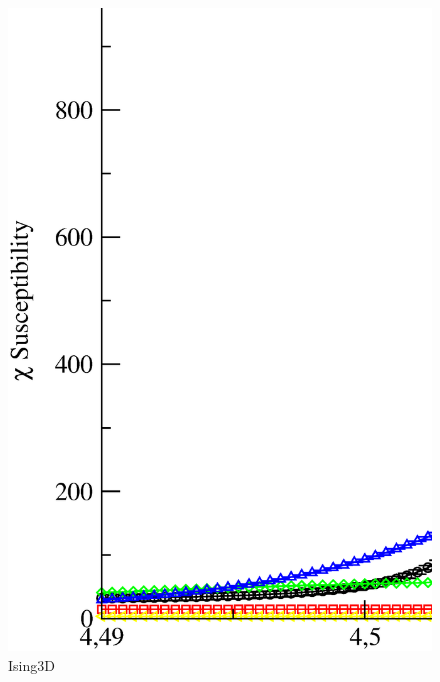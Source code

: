 \begin{figure}[!htpb]
  \centering
  \includegraphics[width=15cm]{./plots/Ising3D/Ising3D_Susceptibility_vs_Temperature.eps}
  \caption{Ising3D}
\end{figure}

